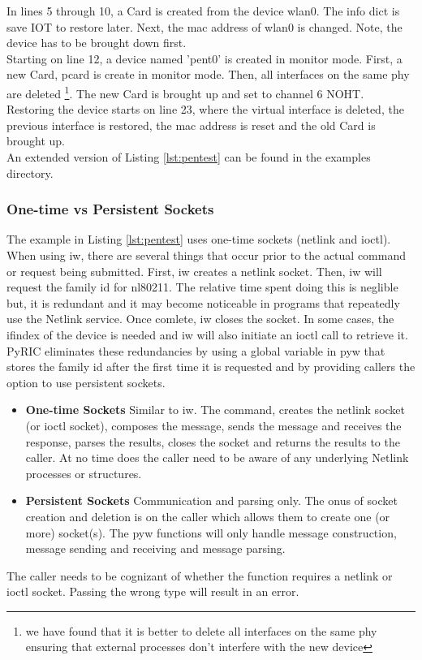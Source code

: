 \documentclass[11pt]{article}
\begin{document}
In lines 5 through 10, a Card is created from the device wlan0. The info dict is save 
IOT to restore later. Next, the mac address of wlan0 is changed. Note, the device has 
to be brought down first. \\

Starting on line 12, a device named 'pent0' is created in monitor mode. First, a new
Card, pcard is create in monitor mode. Then, all interfaces on the same phy are 
deleted \footnote{we have found that it is better to delete all interfaces on the 
same phy ensuring that external processes don't interfere with the new device}. The
new Card is brought up and set to channel 6 NOHT.\\ 

Restoring the device starts on line 23, where the virtual interface is deleted,
the previous interface is restored, the mac address is reset and the old Card is 
brought up. \\

An extended version of Listing \ref{lst:pentest} can be found in the examples 
directory.

\subsubsection{One-time vs Persistent Sockets}
The example in Listing \ref{lst:pentest} uses one-time sockets (netlink and 
ioctl). When using iw, there are several things that occur prior to the actual 
command or request being submitted. First, iw creates a netlink socket. Then, 
iw will request the family id for nl80211. The relative time spent doing this 
is neglible but, it is redundant and it may become noticeable in programs that
repeatedly use the Netlink service. Once comlete, iw closes the socket. In some
cases, the ifindex of the device is needed and iw will also initiate an ioctl 
call to retrieve it. PyRIC eliminates these redundancies by using a global 
variable in pyw that stores the family id after the first time it is requested 
and by providing callers the option to use persistent sockets. 
\begin{itemize}
\item \textbf{One-time Sockets} Similar to iw. The command, creates the netlink 
socket (or ioctl socket), composes the message, sends the message and receives 
the response, parses the results, closes the socket and returns the results to 
the caller. At no time does the caller need to be aware of any underlying Netlink 
processes or structures.
\item \textbf{Persistent Sockets} Communication and parsing only. The onus of 
socket creation and deletion is on the caller which allows them to create one 
(or more) socket(s). The pyw functions will only handle message construction, 
message sending and receiving and message parsing.
\end{itemize}
The caller needs to be cognizant of whether the function requires a netlink or
ioctl socket. Passing the wrong type will result in an error. \\
\end{document}
